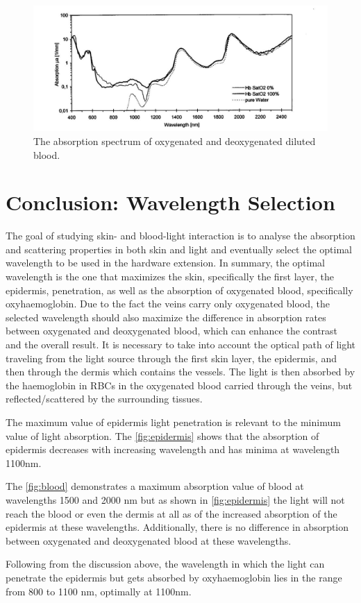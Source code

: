 \begin{figure}[H]
\centering
\includegraphics[scale=0.5]{figures/blood.JPG}
\caption[The absorption spectrum of oxygenated and deoxygenated diluted blood]{The absorption spectrum of oxygenated and deoxygenated diluted blood.}\label{fig:blood}
\end{figure}

\section{Conclusion: Wavelength Selection}
The goal of studying skin- and blood-light interaction is to analyse the absorption and scattering properties in both skin and light and eventually select the optimal wavelength to be used in the hardware extension. In summary, the optimal wavelength is the one that maximizes the skin, specifically the first layer, the epidermis, penetration, as well as the absorption of oxygenated blood, specifically oxyhaemoglobin. Due to the fact the veins carry only oxygenated blood, the selected wavelength should also maximize the difference in absorption rates between oxygenated and deoxygenated blood, which can enhance the contrast and the overall result. It is necessary to take into account the optical path of light traveling from the light source through the first skin layer, the epidermis, and then through the dermis which contains the vessels.  The light is then absorbed by the haemoglobin in RBCs in the oxygenated blood carried through the veins, but reflected/scattered by the surrounding tissues.

The maximum value of epidermis light penetration is relevant to the minimum value of light absorption. The \autoref{fig:epidermis} shows that the absorption of epidermis decreases with increasing wavelength and has minima at wavelength 1100nm.

The \autoref{fig:blood} demonstrates a maximum absorption value of blood at wavelengths 1500 and 2000 nm but as shown in \autoref{fig:epidermis} the light will not reach the blood or even the dermis at all as of the increased absorption of the epidermis at these wavelengths. Additionally, there is no difference in absorption between oxygenated and deoxygenated blood at these wavelengths.

Following from the discussion above, the wavelength in which the light can penetrate the epidermis but gets absorbed by oxyhaemoglobin lies in the range from 800 to 1100 nm, optimally at 1100nm.